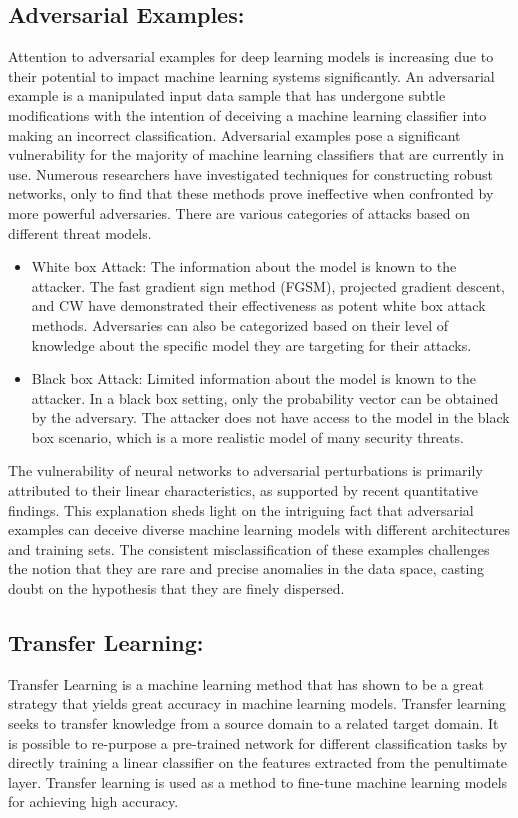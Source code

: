 \documentclass{article}
\begin{document}
\subsection{Adversarial Examples:}
Attention to adversarial examples for deep learning models is increasing due to their potential to impact machine learning systems significantly. An adversarial example is a manipulated input data sample that has undergone subtle modifications with the intention of deceiving a machine learning classifier into making an incorrect classification. Adversarial examples pose a significant vulnerability for the majority of machine learning classifiers that are currently in use.\cite{45818} Numerous researchers have investigated techniques for constructing robust networks, only to find that these methods prove ineffective when confronted by more powerful adversaries. \cite{athalye2018obfuscated} There are various categories of attacks based on different threat models.
\begin{itemize}
    \item White box Attack:
    The information about the model is known to the attacker. The fast gradient sign method (FGSM), projected gradient descent, and CW have demonstrated their effectiveness as potent white box attack methods. Adversaries can also be categorized based on their level of knowledge about the specific model they are targeting for their attacks. \cite{grosse2016adversarial} \cite{goodfellow2018making}

    \item Black box Attack:
    Limited information about the model is known to the attacker. In a black box setting, only the probability vector can be obtained by the adversary. The attacker does not have access to the model in the black box scenario, which is a more realistic model of many security threats.\cite{45818} \cite{goodfellow2018making}
\end{itemize}
The vulnerability of neural networks to adversarial perturbations is primarily attributed to their linear characteristics, as supported by recent quantitative findings. This explanation sheds light on the intriguing fact that adversarial examples can deceive diverse machine learning models with different architectures and training sets. The consistent misclassification of these examples challenges the notion that they are rare and precise anomalies in the data space, casting doubt on the hypothesis that they are finely dispersed.\cite{goodfellow2015explaining} 

\subsection{Transfer Learning:}
Transfer Learning is a machine learning method that has shown to be a great strategy that yields great accuracy in machine learning models. Transfer learning seeks to transfer knowledge from a source domain to a related target domain. \cite{oquab2014learning} It is possible to re-purpose a pre-trained network for different classification tasks by directly training a linear classifier on the features extracted from the penultimate layer.\cite{razavian2014cnn} Transfer learning is used as a method to fine-tune machine learning models for achieving high accuracy.
\end{document}
